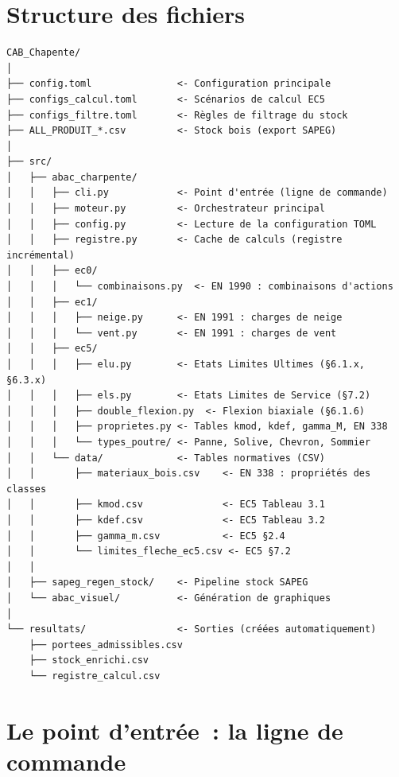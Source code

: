 \documentclass[12pt, a4paper, openany]{book}
\begin{document}
\section{Structure des fichiers}

\begin{lstlisting}[style=toml, language={}, caption={Arborescence du projet (simplifiée)}]
CAB_Chapente/
│
├── config.toml               <- Configuration principale
├── configs_calcul.toml       <- Scénarios de calcul EC5
├── configs_filtre.toml       <- Règles de filtrage du stock
├── ALL_PRODUIT_*.csv         <- Stock bois (export SAPEG)
│
├── src/
│   ├── abac_charpente/
│   │   ├── cli.py            <- Point d'entrée (ligne de commande)
│   │   ├── moteur.py         <- Orchestrateur principal
│   │   ├── config.py         <- Lecture de la configuration TOML
│   │   ├── registre.py       <- Cache de calculs (registre incrémental)
│   │   ├── ec0/
│   │   │   └── combinaisons.py  <- EN 1990 : combinaisons d'actions
│   │   ├── ec1/
│   │   │   ├── neige.py      <- EN 1991 : charges de neige
│   │   │   └── vent.py       <- EN 1991 : charges de vent
│   │   ├── ec5/
│   │   │   ├── elu.py        <- Etats Limites Ultimes (§6.1.x, §6.3.x)
│   │   │   ├── els.py        <- Etats Limites de Service (§7.2)
│   │   │   ├── double_flexion.py  <- Flexion biaxiale (§6.1.6)
│   │   │   ├── proprietes.py <- Tables kmod, kdef, gamma_M, EN 338
│   │   │   └── types_poutre/ <- Panne, Solive, Chevron, Sommier
│   │   └── data/             <- Tables normatives (CSV)
│   │       ├── materiaux_bois.csv    <- EN 338 : propriétés des classes
│   │       ├── kmod.csv              <- EC5 Tableau 3.1
│   │       ├── kdef.csv              <- EC5 Tableau 3.2
│   │       ├── gamma_m.csv           <- EC5 §2.4
│   │       └── limites_fleche_ec5.csv <- EC5 §7.2
│   │
│   ├── sapeg_regen_stock/    <- Pipeline stock SAPEG
│   └── abac_visuel/          <- Génération de graphiques
│
└── resultats/                <- Sorties (créées automatiquement)
    ├── portees_admissibles.csv
    ├── stock_enrichi.csv
    └── registre_calcul.csv
\end{lstlisting}

\section{Le point d'entr\'ee~: la ligne de commande}
\end{document}
